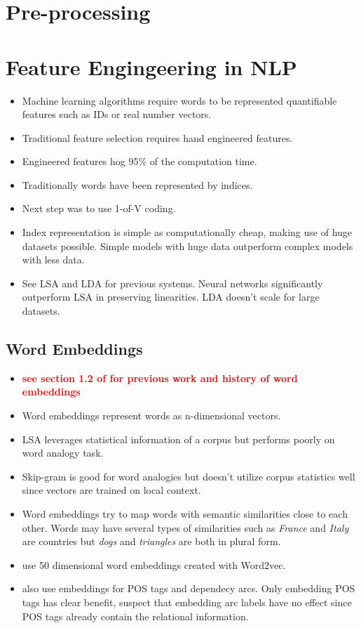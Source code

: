 \documentclass[12pt,a4paper,english
]{tutthesis}
\begin{document}
\section{Pre-processing}
\label{ch:pre-processing}

\section{Feature Engingeering in NLP}
\label{ch:feature_engineering_in_nlp}
\begin{itemize}
\item Machine learning algorithms require words to be represented quantifiable features such as IDs or real number vectors.
\item Traditional feature selection requires hand engineered features.
\item Engineered features hog 95\% of the computation time. \cite{Chen2014}
\item Traditionally words have been represented by indices. \cite{Mikolov2013}
\item Next step was to use 1-of-V coding.
\item Index representation is simple as computationally cheap, making use of huge datasets possible. Simple models with huge data outperform complex models with less data. \cite{Mikolov2013}
\item See LSA and LDA for previous systems. Neural networks significantly outperform LSA in preserving linearities. LDA doesn't scale for large datasets. \cite{Mikolov2013}
\end{itemize}

\subsection{Word Embeddings}
\begin{itemize}
\item \textbf{\textcolor{red}{see section 1.2 of \cite{Mikolov2013} for previous work and history of word embeddings}}
\item Word embeddings represent words as n-dimensional vectors. \cite{Mikolov2013}
\item LSA leverages statistical information of a corpus but performs poorly on word analogy task. \cite{Pennington2014}
\item Skip-gram is good for word analogies but doesn't utilize corpus statistics well since vectors are trained on local context. \cite{Pennington2014}
\item Word embeddings try to map words with semantic similarities close to each other. Words may have several types of similarities such as \textit{France} and \textit{Italy} are countries but \textit{dogs} and \textit{triangles} are both in plural form. \cite{Mikolov2013a}
\item \cite{Chen2014} use 50 dimensional word embeddings created with Word2vec.
\item \cite{Chen2014} also use embeddings for POS tags and dependecy arcs. Only embedding POS tags has clear benefit, \cite{Chen2014} suspect that embedding arc labels have no effect since POS tags already contain the relational information.
\end{itemize}
\end{document}
